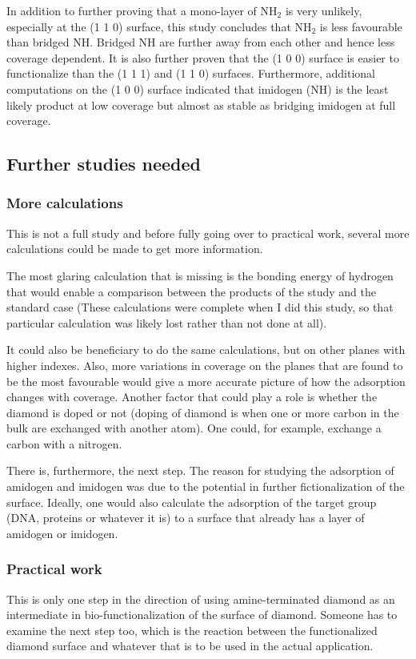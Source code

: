 \documentclass[12pt,a4paper]{article}
\begin{document}
In addition to further proving that a mono-layer of NH$_2$ is very unlikely, especially at the (1 1 0) surface, this study concludes that NH$_2$ is less favourable than bridged NH. Bridged NH are further away from each other and hence less coverage dependent. It is also further proven that the (1 0 0) surface is easier to functionalize than the (1 1 1) and (1 1 0) surfaces. Furthermore, additional computations on the (1 0 0) surface indicated that imidogen (NH) is the least likely product at low coverage but almost as stable as bridging imidogen at full coverage. 

\subsection{Further studies needed}
\subsubsection{More calculations}
This is not a full study and before fully going over to practical work, several more calculations could be made to get more information. 

The most glaring calculation that is missing is the bonding energy of hydrogen that would enable a comparison between the products of the study and the standard case (These calculations were complete when I did this study, so that particular calculation was likely lost rather than not done at all). 

It could also be beneficiary to do the same calculations, but on other planes with higher indexes. Also, more variations in coverage on the planes that are found to be the most favourable would give a more accurate picture of how the adsorption changes with coverage. Another factor that could play a role is whether the diamond is doped or not (doping of diamond is when one or more carbon in the bulk are exchanged with another atom). One could, for example, exchange a carbon with a nitrogen.

There is, furthermore, the next step. The reason for studying the adsorption of amidogen and imidogen was due to the potential in further fictionalization of the surface. Ideally, one would also calculate the adsorption of the target group (DNA, proteins or whatever it is) to a surface that already has a layer of amidogen or imidogen.

\subsubsection{Practical work}
This is only one step in the direction of using amine-terminated diamond as an intermediate in bio-functionalization of the surface of diamond. Someone has to examine the next step too, which is the reaction between the functionalized diamond surface and whatever that is to be used in the actual application. 
\end{document}
